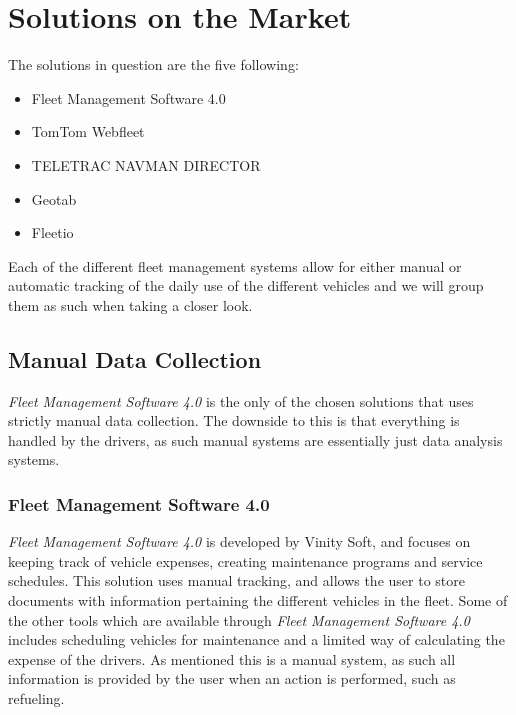 \section{Solutions on the Market}
The solutions in question are the five following:
\begin{itemize}
    \item Fleet Management Software 4.0
    \item TomTom Webfleet
    \item TELETRAC NAVMAN DIRECTOR
    \item Geotab
    \item Fleetio
\end{itemize}
Each of the different fleet management systems allow for either manual or automatic tracking of the daily use of the different vehicles and we will group them as such when taking a closer look.

\subsection{Manual Data Collection}
\textit{Fleet Management Software 4.0} is the only of the chosen solutions that uses strictly manual data collection.
The downside to this is that everything is handled by the drivers, as such manual systems are essentially just data analysis systems.
\subsubsection{Fleet Management Software 4.0}
\textit{Fleet Management Software 4.0} is developed by Vinity Soft, and focuses on keeping track of vehicle expenses, creating maintenance programs and service schedules\cite{vinitysoft}.
This solution uses manual tracking, and allows the user to store documents with information pertaining the different vehicles in the fleet.
Some of the other tools which are available through \textit{Fleet Management Software 4.0} includes scheduling vehicles for maintenance and a limited way of calculating the expense of the drivers.
As mentioned this is a manual system, as such all information is provided by the user when an action is performed, such as refueling.
